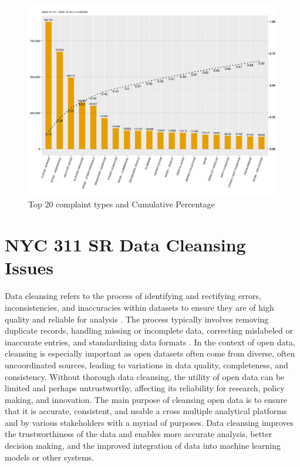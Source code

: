 \documentclass[linenumber]{jdsart}
\begin{document}
\begin{figure}[tbp]
 \centering
  \includegraphics[width = \textwidth]{SR_by_Complaint_Type.pdf} 
  \caption{Top 20 complaint types and Cumulative Percentage} 
  \label{fig:SR_complaints}
\end{figure}


\section{NYC 311 SR Data Cleansing Issues} 
\label{sec:issues}
Data cleansing refers to the process of identifying and rectifying
errors, inconsistencies, and inaccuracies within datasets to ensure
they are of high quality and reliable for analysis
\citep{maletic2005data, hosseinzadeh2023data}. The process
typically involves removing duplicate records, handling missing or
incomplete data, correcting mislabeled or inaccurate entries, and
standardizing data formats \citep[e.g.,][]{cody2017cody,
  van2018statistical}. In the context of open data, cleansing is
especially important as open datasets often come from diverse,
often uncoordinated sources, leading to variations in data quality,
completeness, and consistency. Without thorough data cleansing, 
the utility of open data can be limited and perhaps 
untrustworthy, affecting its reliability for research, 
policy making, and innovation. The main purpose of cleansing 
open data is to ensure that it is accurate, consistent, and usable a
cross multiple analytical platforms and by various stakeholders with a 
myriad of purposes. Data cleansing improves the trustworthiness 
of the data and enables more accurate analysis, 
better decision making, and the improved integration of 
data into machine learning models or other systems.
\end{document}
